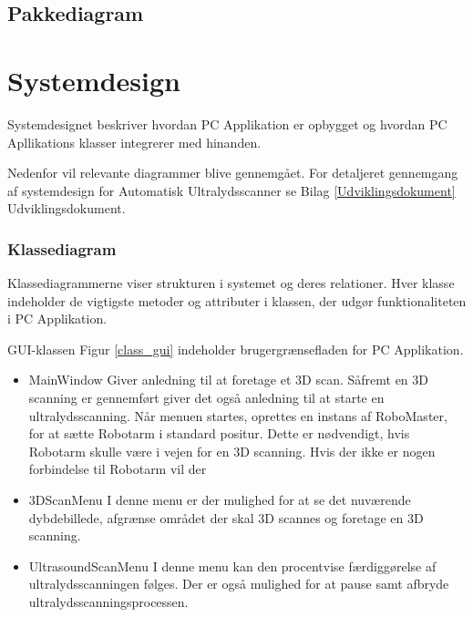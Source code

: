 \subsection{Pakkediagram} 









\section{Systemdesign} \label{Systemdesign}
Systemdesignet beskriver hvordan PC Applikation er opbygget og hvordan PC Apllikations klasser integrerer med hinanden.  

Nedenfor vil relevante diagrammer blive gennemgået. For detaljeret gennemgang af systemdesign for Automatisk Ultralydsscanner se Bilag  \ref{Udviklingsdokument} Udviklingsdokument.

\subsubsection{Klassediagram}
Klassediagrammerne viser strukturen i systemet og deres relationer. Hver klasse indeholder de vigtigste metoder og attributer i klassen, der udgør funktionaliteten i PC Applikation. 

GUI-klassen Figur \ref{class_gui} indeholder brugergrænsefladen for PC Applikation.

\let\labelitemi\labelitemii
\begin{itemize}
\item{MainWindow}\newline
Giver anledning til at foretage et 3D scan. Såfremt en 3D scanning er gennemført giver det også anledning til at starte en ultralydsscanning.
Når menuen startes, oprettes en instans af RoboMaster, for at sætte Robotarm i standard positur. Dette er nødvendigt, hvis Robotarm skulle være i vejen for en 3D scanning.
Hvis der ikke er nogen forbindelse til Robotarm vil der 

\item{3DScanMenu}\newline
I denne menu er der mulighed for at se det nuværende dybdebillede, afgrænse området der skal 3D scannes og foretage en 3D scanning.

\item{UltrasoundScanMenu}\newline
I denne menu kan den procentvise færdiggørelse af ultralydsscanningen følges. Der er også mulighed for at pause samt afbryde ultralydsscanningsprocessen.
\end{itemize}

